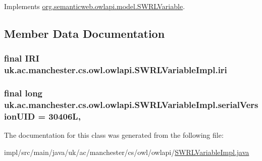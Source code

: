 Implements \hyperlink{interfaceorg_1_1semanticweb_1_1owlapi_1_1model_1_1_s_w_r_l_variable_a8e43e47007c91d300315806d8784ee9d}{org.\-semanticweb.\-owlapi.\-model.\-S\-W\-R\-L\-Variable}.



\subsection{Member Data Documentation}
\hypertarget{classuk_1_1ac_1_1manchester_1_1cs_1_1owl_1_1owlapi_1_1_s_w_r_l_variable_impl_aede8985a4b2f6a014b853ea0145bfe50}{
\subsubsection[{iri}]{\setlength{\rightskip}{0pt plus 5cm}final {\bf I\-R\-I} uk.\-ac.\-manchester.\-cs.\-owl.\-owlapi.\-S\-W\-R\-L\-Variable\-Impl.\-iri\hspace{0.3cm}{\ttfamily [private]}}}\label{classuk_1_1ac_1_1manchester_1_1cs_1_1owl_1_1owlapi_1_1_s_w_r_l_variable_impl_aede8985a4b2f6a014b853ea0145bfe50}
\hypertarget{classuk_1_1ac_1_1manchester_1_1cs_1_1owl_1_1owlapi_1_1_s_w_r_l_variable_impl_a2db52448bcba661148e4fc4fc10a6b65}{
\subsubsection[{serial\-Version\-U\-I\-D}]{\setlength{\rightskip}{0pt plus 5cm}final long uk.\-ac.\-manchester.\-cs.\-owl.\-owlapi.\-S\-W\-R\-L\-Variable\-Impl.\-serial\-Version\-U\-I\-D = 30406\-L\hspace{0.3cm}{\ttfamily [static]}, {\ttfamily [private]}}}\label{classuk_1_1ac_1_1manchester_1_1cs_1_1owl_1_1owlapi_1_1_s_w_r_l_variable_impl_a2db52448bcba661148e4fc4fc10a6b65}


The documentation for this class was generated from the following file\-:\begin{DoxyCompactItemize}
\item 
impl/src/main/java/uk/ac/manchester/cs/owl/owlapi/\hyperlink{_s_w_r_l_variable_impl_8java}{S\-W\-R\-L\-Variable\-Impl.\-java}\end{DoxyCompactItemize}
